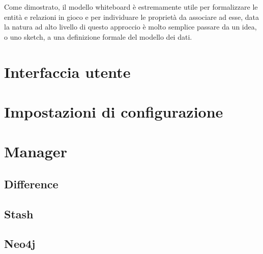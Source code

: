Come dimostrato, il modello whiteboard è estremamente utile per formalizzare le entità e relazioni in gioco e per individuare le proprietà da associare ad esse, data la natura ad alto livello di questo approccio è molto semplice passare da un idea, o uno sketch, a una definizione formale del modello dei dati.
\section{Interfaccia utente}
\section{Impostazioni di configurazione}
\section{Manager}
\subsection{Difference}
\subsection{Stash}
\subsection{Neo4j}





